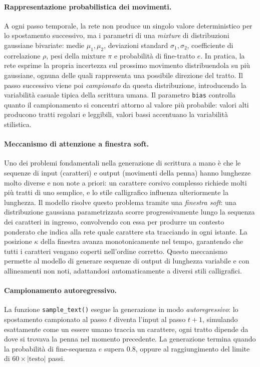 \paragraph{Rappresentazione probabilistica dei movimenti.} A ogni passo temporale, la rete non produce un singolo valore deterministico per lo spostamento successivo, ma i parametri di una \textit{mixture} di distribuzioni gaussiane bivariate: medie $\mu_1, \mu_2$, deviazioni standard $\sigma_1, \sigma_2$, coefficiente di correlazione $\rho$, pesi della mixture $\pi$ e probabilità di fine-tratto $e$. In pratica, la rete esprime la propria incertezza sul prossimo movimento distribuendola su più gaussiane, ognuna delle quali rappresenta una possibile direzione del tratto. Il passo successivo viene poi \textit{campionato} da questa distribuzione, introducendo la variabilità casuale tipica della scrittura umana. Il parametro \texttt{bias} controlla quanto il campionamento si concentri attorno al valore più probabile: valori alti producono tratti regolari e leggibili, valori bassi accentuano la variabilità stilistica.

\paragraph{Meccanismo di attenzione a finestra soft.} Uno dei problemi fondamentali nella generazione di scrittura a mano è che le sequenze di input (caratteri) e output (movimenti della penna) hanno lunghezze molto diverse e non note a priori: un carattere corsivo complesso richiede molti più tratti di uno semplice, e lo stile calligrafico influenza ulteriormente la lunghezza. Il modello risolve questo problema tramite una \textit{finestra soft}: una distribuzione gaussiana parametrizzata scorre progressivamente lungo la sequenza dei caratteri in ingresso, convolvendo con essa per produrre un contesto ponderato che indica alla rete quale carattere sta tracciando in ogni istante. La posizione $\kappa$ della finestra avanza monotonicamente nel tempo, garantendo che tutti i caratteri vengano coperti nell'ordine corretto. Questo meccanismo permette al modello di generare sequenze di output di lunghezza variabile e con allineamenti non noti, adattandosi automaticamente a diversi stili calligrafici.

\paragraph{Campionamento autoregressivo.} La funzione \texttt{sample\_text()} esegue la generazione in modo \textit{autoregressivo}: lo spostamento campionato al passo $t$ diventa l'input al passo $t+1$, simulando esattamente come un essere umano traccia un carattere, ogni tratto dipende da dove si trovava la penna nel momento precedente. La generazione termina quando la probabilità di fine-sequenza $e$ supera 0.8, oppure al raggiungimento del limite di $60 \times |\text{testo}|$ passi.

